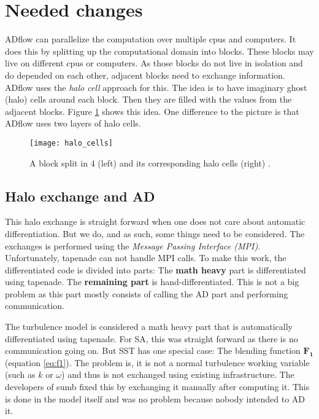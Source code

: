 \section{Needed changes}
ADflow can parallelize the computation over multiple cpus and computers. It
does this by splitting up the computational domain into blocks. These blocks
may live on different cpus or computers. As those blocks do not live in
isolation and do depended on each other, adjacent blocks need to exchange
information. ADflow uses the \textit{halo cell} approach for this. The idea is
to have imaginary ghost (halo) cells around each block. Then they are filled
with the values from the adjacent blocks. Figure \ref{fig:halo_cells} shows
this idea. One difference to the picture is that ADflow uses two layers of halo
cells.

\begin{figure}[H] \centering
\texttt{[image: halo\_cells]}
    \caption{A block split in 4 (left) and its corresponding halo cells (right)
            \cite{cfd_halo}.}
    \label{fig:halo_cells}
\end{figure}




\subsection{Halo exchange and AD}
This halo exchange is straight forward when one does not care about automatic
differentiation. But we do, and as such, some things need to be considered. The
exchanges is performed using the \textit{Message Passing Interface (MPI)}.
Unfortunately, tapenade can not handle MPI calls. To make this work, the
differentiated code is divided into parts: The \textbf{math heavy} part is
differentiated using tapenade. The \textbf{remaining part} is
hand-differentiated. This is not a big problem as this part mostly consists of
calling the AD part and performing communication. 

The turbulence model is considered a math heavy part that is automatically
differentiated using tapenade. For SA, this was straight forward as there is no
communication going on. But SST has one special case: The blending function
$\mathbf{F_1}$ (equation \ref{eq:f1}). The problem is, it is not a normal
turbulence working variable (such as $k$ or $\omega$) and thus is not exchanged
using existing infrastructure. The developers of sumb fixed this by exchanging
it manually after computing it. This is done in the model itself and was no
problem because nobody intended to AD it. \\


